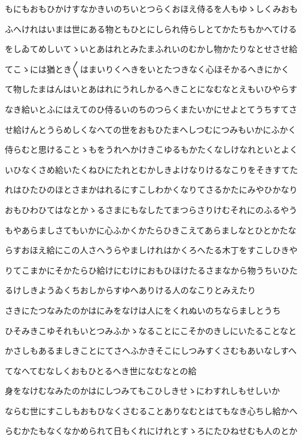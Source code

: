\documentclass[a4paper,11pt,landscape]{ltjtarticle}
\begin{document}
もにもおもひかけすなかきいのちいとつらくおほえ侍るを人もゆゝしくみおも
\par\medskip
ふへけれはいまは世にある物ともひとにしられ侍らしとてかたちもかへてける
\par\medskip
をしゐてめしいてゝいとあはれとみたまふれいのむかし物かたりなとせさせ給
\par\medskip
てこゝには猶とき〱はまいりくへきをいとたつきなく心ほそかるへきにかく
\par\medskip
て物したまはんはいとあはれにうれしかるへきことになむなとえもいひやらす
\par\medskip
なき給いとふにはえてのひ侍るいのちのつらくまたいかにせよとてうちすてさ
\par\medskip
せ給けんとうらめしくなへての世をおもひたまへしつむにつみもいかにふかく
\par\medskip
侍らむと思けることゝもをうれへかけきこゆるもかたくなしけなれといとよく
\par\medskip
いひなくさめ給いたくねひにたれとむかしきよけなりけるなこりをそきすてた
\par\medskip
れはひたひのほとさまかはれるにすこしわかくなりてさるかたにみやひかなり
\par\medskip
おもひわひてはなとかゝるさまにもなしたてまつらさりけむそれにのふるやう
\par\medskip
もやあらましさてもいかに心ふかくかたらひきこえてあらましなとひとかたな
\par\medskip
らすおほえ給にこの人さへうらやましけれはかくろへたる木丁をすこしひきや
\par\medskip
りてこまかにそかたらひ給けにむけにおもひほけたるさまなから物うちいひた
\par\medskip
るけしきようゐくちおしからすゆへありける人のなこりとみえたり
\par\medskip
さきにたつなみたのかはにみをなけは人にをくれぬいのちならましとうち
\par\medskip
ひそみきこゆそれもいとつみふかゝなることにこそかのきしにいたることなと
\par\medskip
かさしもあるましきことにてさへふかきそこにしつみすくさむもあいなしすへ
\par\medskip
てなへてむなしくおもひとるへき世になむなとの給
\par\medskip
身をなけむなみたのかはにしつみてもこひしきせゝにわすれしもせしいか
\par\medskip
ならむ世にすこしもおもひなくさむることありなむとはてもなき心ちし給かへ
\par\medskip
らむかたもなくなかめられて日もくれにけれとすゝろにたひねせむも人のとか
\end{document}
